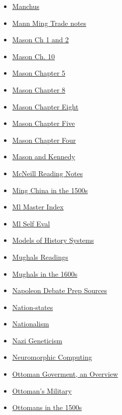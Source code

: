 \documentclass[11pt]{article}
\begin{document}
\begin{itemize}
\begin{itemize}
\item \href{hist201/KBhHIST201Qing1500s.org}{Manchus}
\item \href{hist201/retExr0nMannMingTrade.org}{Mann Ming Trade notes}
\item \href{hist201/KBhHIST201MasonCh1n2.org}{Mason Ch 1 and 2}
\item \href{hist201/KBxMason10.org}{Mason Ch. 10}
\item \href{hist201/KBhHIST201MasonCh5.org}{Mason Chapter 5}
\item \href{hist201/KBhHIST201MasonCh8.org}{Mason Chapter 8}
\item \href{hist201/KBxMasonCh8.org}{Mason Chapter Eight}
\item \href{hist201/KBxHIST201MasonCh5n7.org}{Mason Chapter Five}
\item \href{hist201/KBxMasonCh4.org}{Mason Chapter Four}
\item \href{hist201/KBhHIST201MasonAndKennedy.org}{Mason and Kennedy}
\item \href{hist201/KBMcNeill.org}{McNeill Reading Notes}
\item \href{hist201/KBhHIST201MingChina1500.org}{Ming China in the 1500s}
\item \href{hist201/KBMlMasterIndex.org}{Ml Master Index}
\item \href{hist201/KBMlSelfEval.org}{Ml Self Eval}
\item \href{hist201/KBhHIST201HistModHist.org}{Models of History Systems}
\item \href{hist201/KBe20hist201MughalsReadings.org}{Mughals Readings}
\item \href{hist201/KBhHIST201Mughals1600s.org}{Mughals in the 1600s}
\item \href{hist201/KBhHIST201NapoleonDebatePrep.org}{Napoleon Debate Prep Sources}
\item \href{hist201/KBhHIST201NationStates.org}{Nation-states}
\item \href{hist201/KBhHIST201Nationalism.org}{Nationalism}
\item \href{hist201/Kbe21hist201floNaziGeneticism.org}{Nazi Geneticism}
\item \href{hist201/KBxNeuromorphicComputing.org}{Neuromorphic Computing}
\item \href{hist201/KBhHIST201OttomanGovmntOverview.org}{Ottoman Goverment, an Overview}
\item \href{hist201/KBOttomansMilitary.org}{Ottoman's Military}
\item \href{hist201/KBhHIST201Ottomans1500.org}{Ottomans in the 1500s}

\end{itemize}
\end{itemize}
\end{document}
